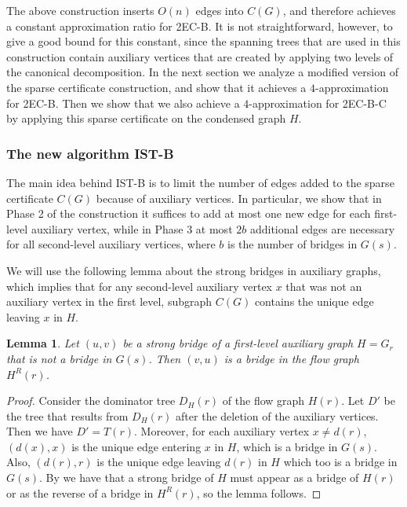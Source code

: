 \documentclass[11pt]{article}
\newtheorem{lemma}[theorem]{Lemma}
\begin{document}
The above construction inserts $O(n)$ edges into $C(G)$, and therefore achieves a constant approximation ratio for \textsf{2EC-B}. It is not straightforward, however, to give a good bound for this constant, since the spanning trees that are used in this construction contain auxiliary vertices that are created by applying two levels of the canonical decomposition. In the next section we analyze a modified version of the sparse certificate construction, and show that it achieves a $4$-approximation for \textsf{2EC-B}. Then we show that we also achieve a $4$-approximation for \textsf{2EC-B-C} by applying this sparse certificate on the condensed graph $H$.

\subsubsection{The new algorithm \textsf{IST-B}}
\label{section:IST-modified}

The main idea behind \textsf{IST-B} is to limit the number of edges added to the sparse certificate $C(G)$ because of auxiliary vertices.
In particular, we show that in Phase 2 of the construction it suffices to add at most one new edge for each first-level auxiliary vertex,
while in Phase 3 at most $2b$ additional edges are necessary for all second-level auxiliary vertices, where $b$ is the number of bridges in $G(s)$.

We will use the following lemma about the strong bridges in auxiliary graphs,
which implies that for any second-level auxiliary vertex $x$ that was not an auxiliary vertex in the first level,
subgraph $C(G)$ contains the unique edge leaving $x$ in $H$.

\begin{lemma}
\label{lemma:auxiliary-graph-strong-bridges}
Let $(u,v)$ be a strong bridge of a first-level auxiliary graph $H=G_r$ that is not a bridge in $G(s)$. Then $(v,u)$ is a bridge in the flow graph $H^R(r)$.
\end{lemma}
\begin{proof}
Consider the dominator tree $D_H(r)$ of the flow graph $H(r)$. Let $D'$ be the tree that results from $D_H(r)$ after the deletion of the auxiliary vertices.
Then we have $D'=T(r)$.
Moreover, for each auxiliary vertex $x \not= d(r)$, $(d(x),x)$ is the unique edge entering $x$ in $H$, which is a bridge in $G(s)$.
Also, $(d(r),r)$ is the unique edge leaving $d(r)$ in $H$ which too is a bridge in $G(s)$.
By \cite{Italiano2012} we have that a strong bridge of $H$ must appear as a bridge of $H(r)$ or as the reverse of a bridge in $H^R(r)$, so the lemma follows.
\end{proof}
\end{document}
